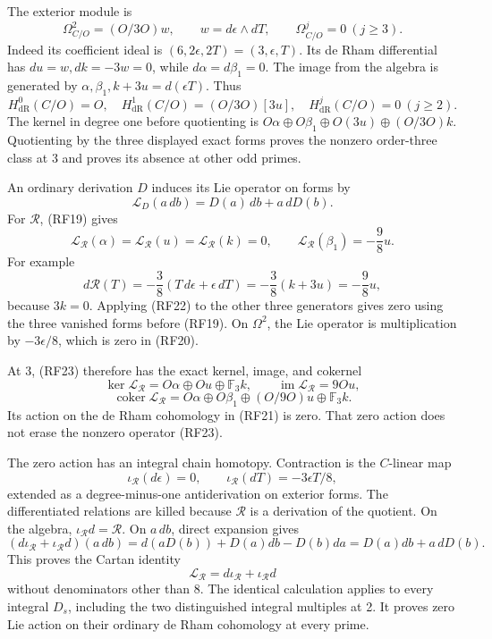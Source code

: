 \documentclass[
]{article}
\begin{document}
The exterior module is \[
\Omega^2_{C/O}=(O/3O)w,\qquad w=d\epsilon\wedge dT,\qquad
\Omega^j_{C/O}=0\ (j\ge3).
\tag{RF20}
\] Indeed its coefficient ideal is \((6,2\epsilon,2T)=(3,\epsilon,T)\).
Its de Rham differential has \(du=w,dk=-3w=0\), while
\(d\alpha=d\beta_1=0\). The image from the algebra is generated by
\(\alpha,\beta_1,k+3u=d(\epsilon T)\). Thus \[
H^0_{\mathrm{dR}}(C/O)=O,\quad
H^1_{\mathrm{dR}}(C/O)=(O/3O)[3u],\quad
H^j_{\mathrm{dR}}(C/O)=0\ (j\ge2).
\tag{RF21}
\] The kernel in degree one before quotienting is
\(O\alpha\oplus O\beta_1\oplus O(3u)\oplus(O/3O)k\). Quotienting by the
three displayed exact forms proves the nonzero order-three class at 3
and proves its absence at other odd primes.

An ordinary derivation \(D\) induces its Lie operator on forms by \[
\mathcal L_D(a\,db)=D(a)\,db+a\,dD(b).
\tag{RF22}
\] For \(\mathcal R\), (RF19) gives \[
\mathcal L_{\mathcal R}(\alpha)
=\mathcal L_{\mathcal R}(u)
=\mathcal L_{\mathcal R}(k)=0,\qquad
\mathcal L_{\mathcal R}(\beta_1)=-\frac98u.
\tag{RF23}
\] For example \[
d\mathcal R(T)
=-\frac38(T\,d\epsilon+\epsilon\,dT)
=-\frac38(k+3u)=-\frac98u,
\] because \(3k=0\). Applying (RF22) to the other three generators gives
zero using the three vanished forms before (RF19). On \(\Omega^2\), the
Lie operator is multiplication by \(-3\epsilon/8\), which is zero in
(RF20).

At 3, (RF23) therefore has the exact kernel, image, and cokernel \[
\ker\mathcal L_{\mathcal R}
=O\alpha\oplus Ou\oplus\mathbb F_3k,\qquad
\operatorname{im}\mathcal L_{\mathcal R}=9Ou,
\] \[
\operatorname{coker}\mathcal L_{\mathcal R}
=O\alpha\oplus O\beta_1\oplus(O/9O)u\oplus\mathbb F_3k.
\tag{RF24}
\] Its action on the de Rham cohomology in (RF21) is zero. That zero
action does not erase the nonzero operator (RF23).

The zero action has an integral chain homotopy. Contraction is the
\(C\)-linear map \[
\iota_{\mathcal R}(d\epsilon)=0,\qquad
\iota_{\mathcal R}(dT)=-3\epsilon T/8,
\] extended as a degree-minus-one antiderivation on exterior forms. The
differentiated relations are killed because \(\mathcal R\) is a
derivation of the quotient. On the algebra,
\(\iota_{\mathcal R}d=\mathcal R\). On \(a\,db\), direct expansion gives
\[
(d\iota_{\mathcal R}+\iota_{\mathcal R}d)(a\,db)
=d(aD(b))+D(a)db-D(b)da
=D(a)db+a\,dD(b).
\] This proves the Cartan identity \[
\mathcal L_{\mathcal R}=d\iota_{\mathcal R}+\iota_{\mathcal R}d
\tag{RF25}
\] without denominators other than 8. The identical calculation applies
to every integral \(D_s\), including the two distinguished integral
multiples at 2. It proves zero Lie action on their ordinary de Rham
cohomology at every prime.
\end{document}
